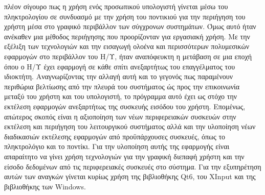 



πλέον σίγουρο πως η χρήση ενός προσωπικού υπολογιστή γίνεται μέσω του
πληκτρολογίου σε συνδυασμό με την χρήση του ποντικιού για την περιήγηση του
χρήστη μέσα στο γραφικό περιβάλλον των σύγχρονων συστημάτων. Όμως αυτό ήταν
ανέκαθεν μια μέθοδος περιήγησης που προορίζονταν για εργασιακή χρήση. Με την
εξέλιξη των τεχνολογιών και την εισαγωγή ολοένα και περισσότερων πολυμεσικών
εφαρμογών στο περιβάλλον του Η/Υ, ήταν αναπόφευκτη η μετάβαση σε μια εποχή
όπου ο Η/Υ έχει εφαρμογή σε κάθε σπίτι ανεξαρτήτως του επαγγέλματος του
ιδιοκτήτη. Αναγνωρίζοντας την αλλαγή αυτή και το γεγονός πως παραμένουν
περιθώρια βελτίωσης από την πλευρά του συστήματος ώς προς την επικοινωνία
μεταξύ του χρήστη και του υπολογιστή, το πρόγραμμα αυτό έχει ως στόχο την
εκτέλεση εφαρμογών ανεξαρτήτως της συσκευής εισόδου του χρήστη. Επομένως,
απώτερος σκοπός είναι η αξιοποίηση των νέων περιφερειακών συσκευών στην
εκτέλεση και περιήγηση του λειτουργικού συστήματος αλλά και την υλοποίηση
νέων διαδικασιών εκτέλεσης εφαρμογών από προϋπάρχουσες συσκευές, όπως το
πληκτρολόγιο και το ποντίκι. Για την υλοποίηση αυτής της εφαρμογής είναι
απαραίτητο να γίνει χρήση τεχνολογιών για την γραφική διεπαφή χρήστη και την
είσοδο δεδομένων από τις περιφερειακές συσκευές στο σύστημα. Για την
εξυπηρέτηση αυτών των αναγκών γίνεται κυρίως χρήση της βιβλιοθήκης Qt6, του
XInput και της βιβλιοθήκης των Windows.






